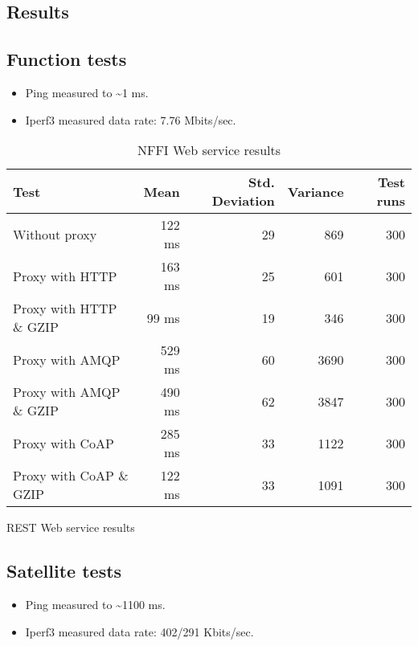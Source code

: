 \begin{appendices}
\chapter{Results}

\section{Function tests}

\begin{itemize}
	\item Ping measured to \textasciitilde 1 ms.
	\item Iperf3 measured data rate: 7.76 Mbits/sec.
\end{itemize}

\begin{table}[H]
\begin{tabular}{| l | r | r | r | r |}
\hline
  \textbf{Test} & \textbf{Mean} & \textbf{Std. Deviation} & \textbf{Variance} & \textbf{Test runs}\\ \hline
  Without proxy & 122 ms & 29 & 869 & 300 \\ \hline
  Proxy with HTTP & 163 ms & 25 & 601 & 300 \\ \hline
  Proxy with HTTP \& GZIP & 99 ms & 19 & 346 & 300 \\ \hline
  Proxy with AMQP & 529 ms & 60 & 3690 & 300 \\ \hline
  Proxy with AMQP \& GZIP & 490 ms & 62 & 3847 & 300\\ \hline
  Proxy with CoAP & 285 ms & 33 & 1122 & 300 \\ \hline
  Proxy with CoAP \& GZIP & 122 ms & 33 & 1091 & 300 \\ \hline
\end{tabular}
\caption{NFFI Web service results}
\end{table}


\begin{table}[H]

\caption{REST Web service results}
\end{table}


\section{Satellite tests}

\begin{itemize}
	\item Ping measured to \textasciitilde 1100 ms.
	\item Iperf3 measured data rate: 402/291 Kbits/sec.
\end{itemize}


\end{appendices}

